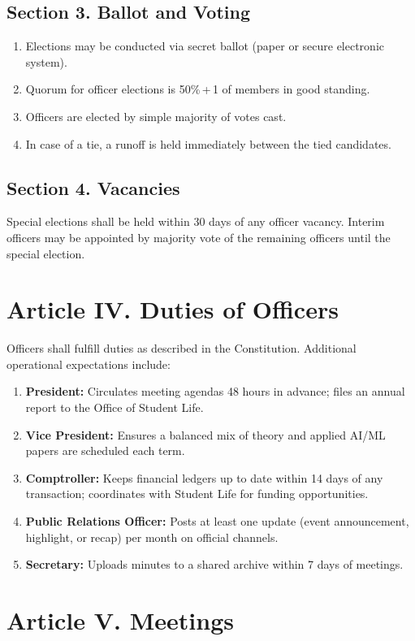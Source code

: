 \documentclass[12pt]{article}
\newcommand{\quorum}{50\%\,+\,1}
\begin{document}
\subsection*{Section 3. Ballot and Voting}
\begin{enumerate}[label=\alph*)]
    \item Elections may be conducted via secret ballot (paper or secure electronic system).
    \item Quorum for officer elections is \quorum{} of members in good standing.
    \item Officers are elected by simple majority of votes cast.
    \item In case of a tie, a runoff is held immediately between the tied candidates.
\end{enumerate}

\subsection*{Section 4. Vacancies}
Special elections shall be held within 30 days of any officer vacancy. Interim officers may be appointed by majority vote of the remaining officers until the special election.

\section*{Article IV. Duties of Officers}
Officers shall fulfill duties as described in the Constitution. Additional operational expectations include:
\begin{enumerate}[label=\alph*)]
    \item \textbf{President:} Circulates meeting agendas 48 hours in advance; files an annual report to the Office of Student Life.
    \item \textbf{Vice President:} Ensures a balanced mix of theory and applied AI/ML papers are scheduled each term.
    \item \textbf{Comptroller:} Keeps financial ledgers up to date within 14 days of any transaction; coordinates with Student Life for funding opportunities.
    \item \textbf{Public Relations Officer:} Posts at least one update (event announcement, highlight, or recap) per month on official channels.
    \item \textbf{Secretary:} Uploads minutes to a shared archive within 7 days of meetings.
\end{enumerate}

\section*{Article V. Meetings}
\end{document}
